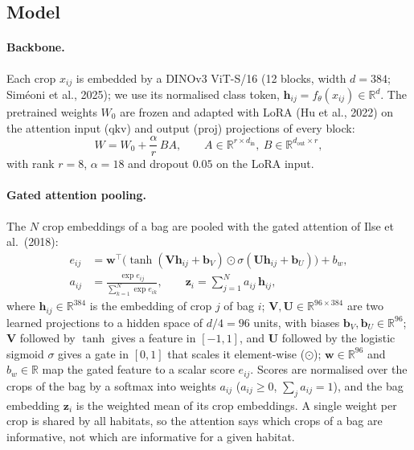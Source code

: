 \subsection{Model}

\paragraph{Backbone.}
Each crop $x_{ij}$ is embedded by a DINOv3 ViT-S/16 (12 blocks, width
$d = 384$; Siméoni et al., 2025); we use its normalised class token,
$\mathbf{h}_{ij} = f_\theta(x_{ij}) \in \mathbb{R}^{d}$.
The pretrained weights $W_0$ are frozen and adapted with LoRA (Hu et al., 2022)
on the attention input ($\mathrm{qkv}$) and output ($\mathrm{proj}$) projections
of every block:
\begin{equation}
  W = W_0 + \frac{\alpha}{r}\, B A, \qquad A \in \mathbb{R}^{r \times d_\text{in}},\ B \in \mathbb{R}^{d_\text{out} \times r},
\end{equation}
with rank $r = 8$, $\alpha = 18$ and dropout $0.05$ on the LoRA input.

\paragraph{Gated attention pooling.}
The $N$ crop embeddings of a bag are pooled with the gated attention of
Ilse et al.\ (2018):
\begin{align}
  e_{ij} &= \mathbf{w}^\top \big( \tanh(\mathbf{V}\mathbf{h}_{ij} + \mathbf{b}_V) \odot \sigma(\mathbf{U}\mathbf{h}_{ij} + \mathbf{b}_U) \big) + b_w, \\
  a_{ij} &= \frac{\exp e_{ij}}{\sum_{k=1}^{N} \exp e_{ik}}, \qquad
  \mathbf{z}_i = \sum_{j=1}^{N} a_{ij}\, \mathbf{h}_{ij},
\end{align}
where $\mathbf{h}_{ij} \in \mathbb{R}^{384}$ is the embedding of crop $j$ of bag
$i$; $\mathbf{V}, \mathbf{U} \in \mathbb{R}^{96 \times 384}$ are two learned
projections to a hidden space of $d/4 = 96$ units, with biases
$\mathbf{b}_V, \mathbf{b}_U \in \mathbb{R}^{96}$; $\mathbf{V}$ followed by
$\tanh$ gives a feature in $[-1, 1]$, and $\mathbf{U}$ followed by the logistic
sigmoid $\sigma$ gives a gate in $[0, 1]$ that scales it element-wise ($\odot$);
$\mathbf{w} \in \mathbb{R}^{96}$ and $b_w \in \mathbb{R}$ map the gated feature
to a scalar score $e_{ij}$. Scores are normalised over the crops of the bag by a
softmax into weights $a_{ij}$ ($a_{ij} \ge 0$, $\sum_j a_{ij} = 1$), and the bag
embedding $\mathbf{z}_i$ is the weighted mean of its crop embeddings. A single weight per crop is shared by all habitats, so the attention
says which crops of a bag are informative, not which are informative for a
given habitat.

